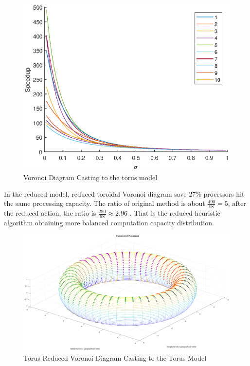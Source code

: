 \begin{figure}[!ht]
\centering
\includegraphics[width=1\columnwidth]{figure/t_voronoi_speedup.eps}
\caption{Voronoi Diagram Casting to the torus model}
\label{fig:t_voronoi_speedup}
\end{figure}
\newpage

In the reduced model, reduced toroidal Voronoi diagram save $27\%$ processors hit the same processing capacity.  The ratio of original method is about $\frac{490}{98} = 5$, after the reduced action, the ratio is $\frac{290}{98} \approx 2.96 $ . That is the reduced heuristic algorithm obtaining more balanced computation capacity distribution.

\begin{figure}[!ht]
\centering
\includegraphics[width=1\columnwidth]{figure/t_voronoi_torus_save.eps}
\caption{Torus Reduced Voronoi Diagram Casting to the Torus Model}
\label{fig:t_voronoi_torus_save}
\end{figure}

